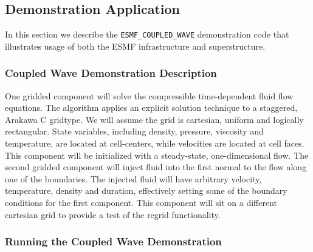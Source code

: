 \subsection{Demonstration Application}
\label{sec:demo}

In this section we describe the {\tt ESMF\_COUPLED\_WAVE} demonstration code that 
illustrates usage of both the ESMF infrastructure and superstructure. 

\subsubsection{Coupled Wave Demonstration Description}

One gridded component will solve the compressible time-dependent fluid 
flow equations.  The algorithm applies an explicit solution technique to 
a staggered, Arakawa C gridtype.  We will assume the grid is cartesian, 
uniform and logically rectangular.  State variables, including density, 
pressure, viscosity and temperature, are located at cell-centers, while 
velocities are located at cell faces.  This component will be 
initialized with a steady-state, one-dimensional flow.  The second 
gridded component will inject fluid into the first normal to the flow 
along one of the boundaries.  The injected fluid will have arbitrary 
velocity, temperature, density and duration, effectively setting some of 
the boundary conditions for the first component.  This component will 
sit on a different cartesian grid to provide a test of the regrid 
functionality.

\subsubsection{Running the Coupled Wave Demonstration}





